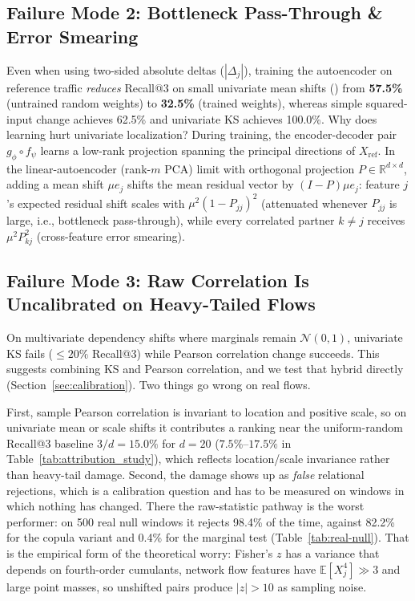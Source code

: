 \documentclass[10pt,conference]{IEEEtran}
\begin{document}
\subsection{Failure Mode 2: Bottleneck Pass-Through \& Error Smearing}
Even when using two-sided absolute deltas ($|\Delta_j|$), training the
autoencoder on reference traffic \emph{reduces} Recall@3 on small univariate
mean shifts () from \textbf{57.5\%} (untrained
random weights) to \textbf{32.5\%} (trained weights), whereas simple squared-input
change achieves 62.5\% and univariate KS achieves 100.0\%.
Why does learning hurt univariate localization? During training, the encoder-decoder
pair $g_\phi \circ f_\psi$ learns a low-rank projection spanning the principal
directions of $X_{\mathrm{ref}}$. In the linear-autoencoder (rank-$m$ PCA)
limit with orthogonal projection $P \in \mathbb{R}^{d \times d}$, adding a mean
shift $\mu e_j$ shifts the mean residual vector by $(I - P)\mu e_j$: feature $j$'s
expected residual shift scales with $\mu^2 (1 - P_{jj})^2$ (attenuated whenever
$P_{jj}$ is large, i.e., bottleneck pass-through), while every correlated partner
$k \neq j$ receives $\mu^2 P_{kj}^2$ (cross-feature error smearing).

\subsection{Failure Mode 3: Raw Correlation Is Uncalibrated on Heavy-Tailed Flows}
On multivariate dependency shifts where marginals remain $\mathcal{N}(0,1)$,
univariate KS fails ($\leq 20\%$ Recall@3) while Pearson correlation change
succeeds. This suggests combining KS and Pearson correlation, and we test that
hybrid directly (Section~\ref{sec:calibration}). Two things go wrong on real
flows.

First, sample Pearson correlation is invariant to location and positive scale, so on
univariate mean or scale shifts it contributes a ranking near the uniform-random
Recall@3 baseline $3/d = 15.0\%$ for $d = 20$ ($7.5\%$--$17.5\%$ in
Table~\ref{tab:attribution_study}), which reflects location/scale invariance rather
than heavy-tail damage.
Second, the damage shows up as \emph{false} relational rejections, which is a
calibration question and has to be measured on windows in which nothing has
changed. There the raw-statistic pathway is the worst performer: on 500 real
null windows it rejects 98.4\% of the time, against 82.2\% for the copula
variant and 0.4\% for the marginal test (Table~\ref{tab:real-null}). That is the
empirical form of the theoretical worry: Fisher's $z$ has a variance that depends
on fourth-order cumulants, network flow features have $\mathbb{E}[X_j^4] \gg 3$
and large point masses, so unshifted pairs produce $|z| > 10$ as sampling noise.
\end{document}
